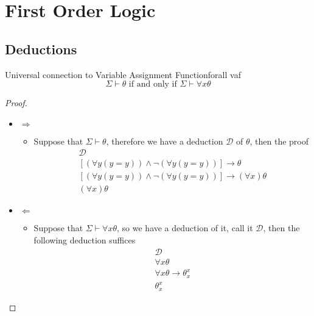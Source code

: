 \chapter{First Order Logic}

\section{Deductions}

\begin{lemma}{Universal connection to Variable Assignment Function}{forall vaf}
    \[
    \Sigma \vdash \theta \text { if and only if } \Sigma \vdash \forall x \theta
    \]
\end{lemma}


\begin{proof}
    \begin{itemize}
        \item $ \Rightarrow $ 
        \begin{itemize}
            \item Suppose that $ \Sigma \vdash \theta$, therefore we have a deduction $ \mathcal{D}$ of $ \theta$, then the proof
                \begin{gather*}
                    \mathcal{D}\\
                    \left[ \left( \forall y \left( y =  y \right) \right) \land  \neg \left( \forall y \left( y =  y \right) \right) \right] \rightarrow \theta \tag{taut. PC}\\
                    \left[ \left( \forall y \left( y =  y \right) \right) \land  \neg \left( \forall y \left( y =  y \right) \right) \right] \rightarrow \left(  \forall  x \right)\theta \tag{QR}\\
                    \left(  \forall x \right) \theta \tag{PC}
                \end{gather*}
        \end{itemize}
        \item $ \Leftarrow $
        \begin{itemize}
            \item Suppose that $ \Sigma \vdash \forall x \theta$, so we have a deduction of it, call it  $\mathcal{D}$, then the following deduction suffices
            \begin{gather*}
               \mathcal{D} \\
               \forall x \theta\\
               \forall x \theta \rightarrow \theta _{x}^{x}\\
                \theta _{x}^{x}
            \end{gather*}
        \end{itemize}
    \end{itemize}
\end{proof}


